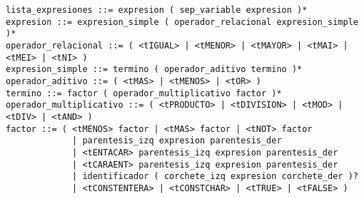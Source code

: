 \begin{Verbatim}[fontsize=\small]
lista_expresiones ::= expresion ( sep_variable expresion )*
expresion ::= expresion_simple ( operador_relacional expresion_simple )*
operador_relacional ::= ( <tIGUAL> | <tMENOR> | <tMAYOR> | <tMAI> | <tMEI> | <tNI> )
expresion_simple ::= termino ( operador_aditivo termino )*
operador_aditivo ::= ( <tMAS> | <tMENOS> | <tOR> )
termino ::= factor ( operador_multiplicativo factor )*
operador_multiplicativo ::= ( <tPRODUCTO> | <tDIVISION> | <tMOD> | <tDIV> | <tAND> )
factor ::= ( <tMENOS> factor | <tMAS> factor | <tNOT> factor
             | parentesis_izq expresion parentesis_der
             | <tENTACAR> parentesis_izq expresion parentesis_der
             | <tCARAENT> parentesis_izq expresion parentesis_der
             | identificador ( corchete_izq expresion corchete_der )?
             | <tCONSTENTERA> | <tCONSTCHAR> | <tTRUE> | <tFALSE> )
\end{Verbatim}
